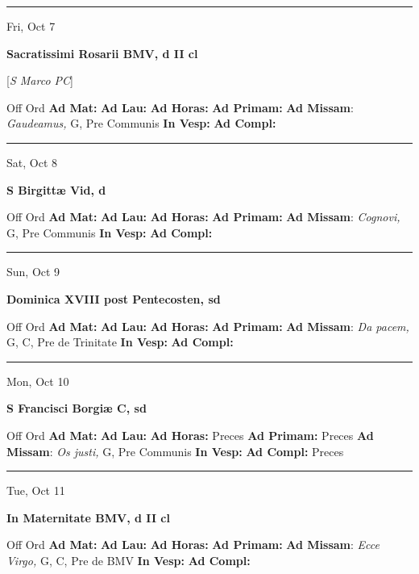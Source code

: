 \documentclass[letterpaper, 10pt]{article}
\begin{document}
\hrule
\begin{center}
Fri, Oct 7
\end{center}\textbf{ \large Sacratissimi Rosarii BMV, \textnormal{\normalsize d II cl}}

[\textit{S Marco PC}]
\begin{justify}
Off Ord
\textbf{Ad Mat: }
\textbf{Ad Lau: }
\textbf{Ad Horas: }
\textbf{Ad Primam: }
\textbf{Ad Missam}: \textit{Gaudeamus,} G, Pre Communis
\textbf{In Vesp: }
\textbf{Ad Compl: }\end{justify}



\hrule
\begin{center}
Sat, Oct 8
\end{center}\textbf{ \large S Birgittæ Vid, \textnormal{\normalsize d}}
\begin{justify}
Off Ord
\textbf{Ad Mat: }
\textbf{Ad Lau: }
\textbf{Ad Horas: }
\textbf{Ad Primam: }
\textbf{Ad Missam}: \textit{Cognovi,} G, Pre Communis
\textbf{In Vesp: }
\textbf{Ad Compl: }\end{justify}



\hrule
\begin{center}
Sun, Oct 9
\end{center}\textbf{ \large Dominica XVIII post Pentecosten, \textnormal{\normalsize sd}}
\begin{justify}
Off Ord
\textbf{Ad Mat: }
\textbf{Ad Lau: }
\textbf{Ad Horas: }
\textbf{Ad Primam: }
\textbf{Ad Missam}: \textit{Da pacem,} G, C, Pre de Trinitate
\textbf{In Vesp: }
\textbf{Ad Compl: }\end{justify}



\hrule
\begin{center}
Mon, Oct 10
\end{center}\textbf{ \large S Francisci Borgiæ C, \textnormal{\normalsize sd}}
\begin{justify}
Off Ord
\textbf{Ad Mat: }
\textbf{Ad Lau: }
\textbf{Ad Horas: }Preces
\textbf{Ad Primam: }Preces
\textbf{Ad Missam}: \textit{Os justi,} G, Pre Communis
\textbf{In Vesp: }
\textbf{Ad Compl: }Preces\end{justify}



\hrule
\begin{center}
Tue, Oct 11
\end{center}\textbf{ \large In Maternitate BMV, \textnormal{\normalsize d II cl}}
\begin{justify}
Off Ord
\textbf{Ad Mat: }
\textbf{Ad Lau: }
\textbf{Ad Horas: }
\textbf{Ad Primam: }
\textbf{Ad Missam}: \textit{Ecce Virgo,} G, C, Pre de BMV
\textbf{In Vesp: }
\textbf{Ad Compl: }\end{justify}
\end{document}
